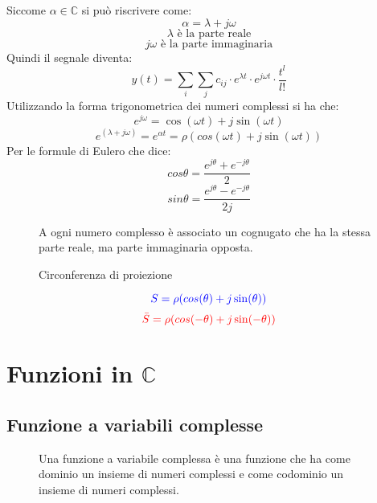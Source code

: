 \documentclass[a4paper]{article}
\begin{document}
\vspace{1em}
\noindent
Siccome \( \alpha \in \mathbb{C} \) si può riscrivere come:
\[
\alpha = \lambda + j \omega
\] 
\[
  \lambda \text{ è la parte reale}
\] 
\[
  j \omega \text{ è la parte immaginaria}
\] 
Quindi il segnale diventa:
\[
  y(t) = \sum_{i} \sum_{j} c_{ij} \cdot e^{\lambda t} \cdot e^{j \omega t} \cdot \frac{t^l}{l!}
\] 
Utilizzando la forma trigonometrica dei numeri complessi si ha che:
\[
  e^{j \omega} = \cos(\omega t) + j \sin(\omega t)
\] 
\[
  e^{(\lambda + j \omega)} = e^{\alpha t} = \rho (cos(\omega t) + j \sin(\omega t))
\] 
Per le formule di Eulero che dice:
\[
  cos\theta = \frac{e^{j \theta} + e^{-j \theta}}{2}
\] 
\[
  sin\theta = \frac{e^{j \theta} - e^{-j \theta}}{2j}
\]
\begin{figure}[H]
  \begin{definition}
    A ogni numero complesso è associato un cognugato che ha la stessa parte reale,
    ma parte immaginaria opposta.
  \end{definition}
\end{figure}
\begin{figure}[H]
  \centering
  \caption{Circonferenza di proiezione}
\end{figure}
\[
  \color{blue} S = \rho (cos(\theta) + j \sin(\theta)) \color{black}
\] 
\[
  \color{red} \bar{S} = \rho (cos(-\theta) + j \sin(-\theta)) \color{black}
\]
\section{Funzioni in \texorpdfstring{\( \mathbb{C} \)}{C}}
\subsection{Funzione a variabili complesse}
\begin{figure}[H]
  \begin{definition}
    Una funzione a variabile complessa è una funzione che ha come dominio un insieme
    di numeri complessi e come codominio un insieme di numeri complessi.
  \end{definition}
\end{figure}
\end{document}
